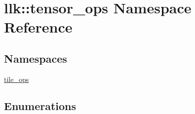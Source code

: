 \hypertarget{namespacellk_1_1tensor__ops}{}\section{llk\+:\+:tensor\+\_\+ops Namespace Reference}
\label{namespacellk_1_1tensor__ops}
\subsection*{Namespaces}
\begin{DoxyCompactItemize}
\item 
 \hyperlink{namespacellk_1_1tensor__ops_1_1tile__ops}{tile\+\_\+ops}
\end{DoxyCompactItemize}
\subsection*{Enumerations}
